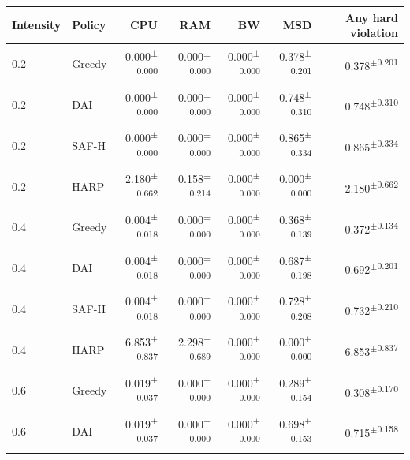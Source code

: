 \documentclass[final,5p]{elsarticle}
\begin{document}
\begin{table}[p]
\centering
\color{revisiongreen}\small
\begin{tabular}{llrrrrr}
\toprule
Intensity & Policy & CPU & RAM & BW & MSD & Any hard violation \\
\midrule
0.2 & Greedy & 0.000\textsuperscript{$\pm$0.000} & 0.000\textsuperscript{$\pm$0.000} & 0.000\textsuperscript{$\pm$0.000} & 0.378\textsuperscript{$\pm$0.201} & 0.378\textsuperscript{$\pm$0.201} \\
0.2 & DAI & 0.000\textsuperscript{$\pm$0.000} & 0.000\textsuperscript{$\pm$0.000} & 0.000\textsuperscript{$\pm$0.000} & 0.748\textsuperscript{$\pm$0.310} & 0.748\textsuperscript{$\pm$0.310} \\
0.2 & SAF-H & 0.000\textsuperscript{$\pm$0.000} & 0.000\textsuperscript{$\pm$0.000} & 0.000\textsuperscript{$\pm$0.000} & 0.865\textsuperscript{$\pm$0.334} & 0.865\textsuperscript{$\pm$0.334} \\
0.2 & HARP & 2.180\textsuperscript{$\pm$0.662} & 0.158\textsuperscript{$\pm$0.214} & 0.000\textsuperscript{$\pm$0.000} & 0.000\textsuperscript{$\pm$0.000} & 2.180\textsuperscript{$\pm$0.662} \\
0.4 & Greedy & 0.004\textsuperscript{$\pm$0.018} & 0.000\textsuperscript{$\pm$0.000} & 0.000\textsuperscript{$\pm$0.000} & 0.368\textsuperscript{$\pm$0.139} & 0.372\textsuperscript{$\pm$0.134} \\
0.4 & DAI & 0.004\textsuperscript{$\pm$0.018} & 0.000\textsuperscript{$\pm$0.000} & 0.000\textsuperscript{$\pm$0.000} & 0.687\textsuperscript{$\pm$0.198} & 0.692\textsuperscript{$\pm$0.201} \\
0.4 & SAF-H & 0.004\textsuperscript{$\pm$0.018} & 0.000\textsuperscript{$\pm$0.000} & 0.000\textsuperscript{$\pm$0.000} & 0.728\textsuperscript{$\pm$0.208} & 0.732\textsuperscript{$\pm$0.210} \\
0.4 & HARP & 6.853\textsuperscript{$\pm$0.837} & 2.298\textsuperscript{$\pm$0.689} & 0.000\textsuperscript{$\pm$0.000} & 0.000\textsuperscript{$\pm$0.000} & 6.853\textsuperscript{$\pm$0.837} \\
0.6 & Greedy & 0.019\textsuperscript{$\pm$0.037} & 0.000\textsuperscript{$\pm$0.000} & 0.000\textsuperscript{$\pm$0.000} & 0.289\textsuperscript{$\pm$0.154} & 0.308\textsuperscript{$\pm$0.170} \\
0.6 & DAI & 0.019\textsuperscript{$\pm$0.037} & 0.000\textsuperscript{$\pm$0.000} & 0.000\textsuperscript{$\pm$0.000} & 0.698\textsuperscript{$\pm$0.153} & 0.715\textsuperscript{$\pm$0.158} \\

\end{tabular}
\end{table}
\end{document}
